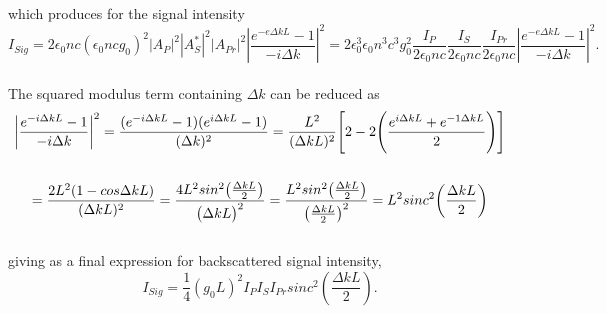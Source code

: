 \documentclass[%
  reprint,
  superscriptaddress,
  amsmath,amssymb,
  aps,
  prapplied,
]{revtex4-2}
\begin{document}
which produces for the signal intensity
\\
\begin{equation}
  I_{Sig} = 2\epsilon_{0}nc(\epsilon_{0}ncg_{0})^{2}|A_{P}|^{2}|A_{S}^{*}|^{2}|A_{Pr}|^{2}\left|\frac{e^{-e\Delta kL} - 1}{-i\Delta k}\right|^{2}
  = 2\epsilon_{0}^{3}\epsilon_{0}n^{3}c^{3}g_{0}^{2}\frac{I_{P}}{2\epsilon_{0}nc}\frac{I_{S}}{2\epsilon_{0}nc}\frac{I_{Pr}}{2\epsilon_{0}nc}\left|\frac{e^{-e\Delta kL} - 1}{-i\Delta k}\right|^{2}.
\end{equation}
\\
The squared modulus term containing $\Delta k$ can be reduced as
\\
\begin{gather}
  \bigg|\frac{e^{-i\Delta kL} - 1}{-i\Delta k}\bigg|^{2} = \frac{(e^{-i\Delta kL} - 1)(e^{i\Delta kL} - 1)}{(\Delta k)^{2}} = \frac{L^{2}}{(\Delta kL)^{2}}\Bigg[ 2 - 2\Bigg(\frac{e^{i\Delta kL} + e^{-1\Delta kL}}{2}\Bigg)\Bigg] \notag \\ \notag \\
  = \frac{2L^{2}(1 - cos\Delta kL)}{(\Delta kL)^{2}} = \frac{4L^{2}sin^{2}\big(\frac{\Delta kL}{2}\big)}{\big(\Delta kL\big)^{2}} = \frac{L^{2}sin^{2}\big(\frac{\Delta kL}{2}\big)}{\big(\frac{\Delta kL}{2}\big)^{2}} = L^{2}sinc^{2}\bigg(\frac{\Delta kL}{2}\bigg)
\end{gather}
\\
giving as a final expression for backscattered signal intensity,
\\
\begin{equation}
I_{Sig} = \frac{1}{4}(g_{0}L)^{2}I_{P}I_{S}I_{Pr}sinc^{2}\left(\frac{\Delta kL}{2}\right).
\end{equation}
\\
\end{document}
